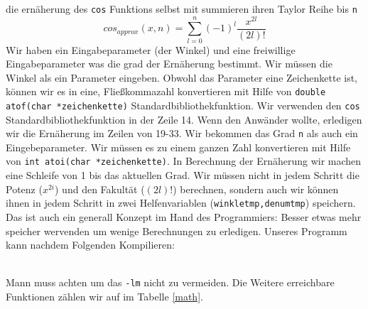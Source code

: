 die ernäherung des \texttt{cos} Funktions selbst mit summieren ihren Taylor Reihe
bis \texttt{n}
\begin{equation}
cos_{approx}\left(x,n\right)=\sum_{l=0}^{n} \left(-1\right)^{l} \dfrac{x^{2l}}{\left(2l\right)!}
\end{equation}
Wir haben ein Eingabeparameter (der Winkel) und eine freiwillige Eingabeparameter
was die grad der Ernäherung bestimmt. Wir müssen die Winkel als ein Parameter eingeben.
Obwohl das Parameter eine Zeichenkette ist, können wir es in eine, Fließkommazahl konvertieren
mit Hilfe von \texttt{double atof(char *zeichenkette)} Standardbibliothekfunktion. 
Wir verwenden den \texttt{cos} Standardbibliothekfunktion in der Zeile 14. Wenn
den Anwänder wollte, erledigen wir die Ernäherung im Zeilen von 19-33. Wir bekommen 
das Grad \texttt{n} als auch ein Eingebeparameter. Wir müssen es zu einem ganzen 
Zahl konvertieren mit Hilfe von \texttt{int atoi(char *zeichenkette)}. In Berechnung der Ernäherung wir machen 
eine Schleife von 1 bis das aktuellen Grad. Wir müssen nicht in jedem Schritt die 
Potenz ($x^{2i}$) und den Fakultät ($(2l)!$) berechnen, sondern auch wir können 
ihnen in jedem Schritt in zwei Helfenvariablen (\texttt{winkletmp,denumtmp}) speichern.
Das ist auch ein generall Konzept im Hand des Programmiers: Besser etwas mehr speicher
wervenden um wenige Berechnungen zu erledigen. 
Unseres Programm kann nachdem Folgenden Kompilieren:\\
\\
Mann muss achten um das \texttt{-lm} nicht zu vermeiden.
Die Weitere erreichbare  Funktionen zählen wir auf im Tabelle \ref{math}. 
